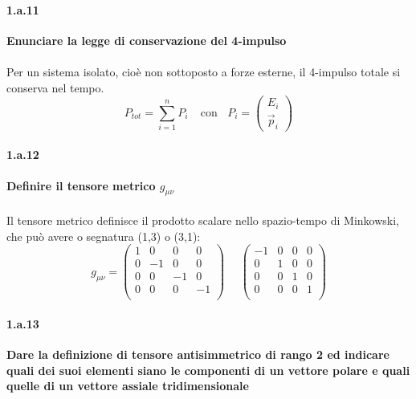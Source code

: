 \documentclass[twoside]{article}
\begin{document}
\paragraph{1.a.11} \textbf{Enunciare la legge di conservazione del 4-impulso} \\ \\
Per un sistema isolato, cioè non sottoposto a forze esterne,
il 4-impulso totale si conserva nel tempo.
\[
P_{tot}=\sum_{i=1}^n P_i \ \ \ \ \ \text{con} \ \ \ \ P_i= \begin{pmatrix}
E_i \\
\vec{p}_i
\end{pmatrix}
\]

\paragraph{1.a.12} \textbf{Definire il tensore metrico $g_{\mu \nu}$}
\\ \\
Il tensore metrico definisce il prodotto scalare nello spazio-tempo di Minkowski, che può avere o segnatura (1,3) o (3,1):
\[
g_{\mu \nu}=\begin{pmatrix}
1 & 0 & 0 & 0 \\
0 & -1 & 0 & 0 \\
0 & 0 & -1 & 0 \\
0 & 0 & 0 & -1 \\
\end{pmatrix} \ \ \ \ \ \ \begin{pmatrix}
-1 & 0 & 0 & 0 \\
0 & 1 & 0 & 0 \\
0 & 0 & 1 & 0 \\
0 & 0 & 0 & 1 \\
\end{pmatrix}
\]


\paragraph{1.a.13} \textbf{Dare la definizione di tensore antisimmetrico di rango 2 ed indicare quali dei
suoi elementi siano le componenti di un vettore polare e quali quelle di un vettore
assiale tridimensionale}\\ \\
\end{document}
